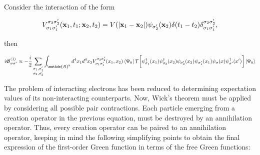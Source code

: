 \documentclass{homework}
\begin{document}
Consider the interaction of the form 

$$
    V_{\sigma_1\sigma'_1}^{\sigma_2\sigma'_2}({{\bf x}}_1, t_1; {{\bf x}}_2, t_2) = V(|{{\bf x}}_1 - {{\bf x}}_2|) \psi_{\sigma_2'}({{\bf x}}_2) \delta(t_1-t_2) \delta_{\sigma_1\sigma'_1}^{\sigma_2\sigma'_2},
$$

then

\begin{equation}
    \begin{split}
        i \mathfrak{G}_{\sigma \sigma'}^{(1)} \propto - \frac{i}{2} \sum_{{\substack{\sigma_1, \sigma'_1 
         \\ \sigma_2, \sigma_2'}}}
        \int_{\mathds{R}^8} d^4x_1 d^4x_2 V_{\sigma_1\sigma'_1}^{\sigma_2\sigma'_2}(x_1, x_2) \bra{\Psi_0} \mathcal{T} \bigg[ \psi_{\sigma_1}^\dagger(x_1) \psi_{\sigma_2}^\dagger(x_2) \psi_{\sigma'_2}(x_2) \psi_{\sigma'_1}(x_1) \psi_{\sigma}(x) \psi^\dagger_{\sigma'}(x') \bigg] \ket{\Psi_0}
        \label{first_order_perturb_Green_function}
    \end{split}
\end{equation}

The problem of interacting electrons has been reduced to determining expectation values of its non-interacting counterparts. Now, Wick's theorem must be applied by considering all possible pair contractions. Each particle emerging from a creation operator in the previous equation, must be destroyed by an annihilation operator. Thus, every creation operator can be paired to an annihilation operator, keeping in mind the following simplifying points to obtain the final expression of the first-order Green function in terms of the free Green functions:
\end{document}

